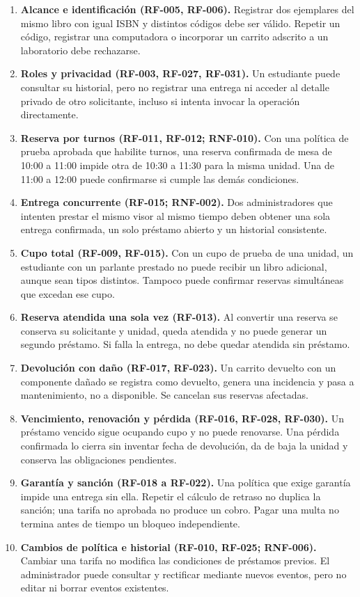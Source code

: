 \begin{enumerate}
    \item \textbf{Alcance e identificaci\'on (RF-005, RF-006).} Registrar dos ejemplares del mismo libro con igual ISBN y distintos c\'odigos debe ser v\'alido. Repetir un c\'odigo, registrar una computadora o incorporar un carrito adscrito a un laboratorio debe rechazarse.
    \item \textbf{Roles y privacidad (RF-003, RF-027, RF-031).} Un estudiante puede consultar su historial, pero no registrar una entrega ni acceder al detalle privado de otro solicitante, incluso si intenta invocar la operaci\'on directamente.
    \item \textbf{Reserva por turnos (RF-011, RF-012; RNF-010).} Con una pol\'itica de prueba aprobada que habilite turnos, una reserva confirmada de mesa de 10:00 a 11:00 impide otra de 10:30 a 11:30 para la misma unidad. Una de 11:00 a 12:00 puede confirmarse si cumple las dem\'as condiciones.
    \item \textbf{Entrega concurrente (RF-015; RNF-002).} Dos administradores que intenten prestar el mismo visor al mismo tiempo deben obtener una sola entrega confirmada, un solo pr\'estamo abierto y un historial consistente.
    \item \textbf{Cupo total (RF-009, RF-015).} Con un cupo de prueba de una unidad, un estudiante con un parlante prestado no puede recibir un libro adicional, aunque sean tipos distintos. Tampoco puede confirmar reservas simult\'aneas que excedan ese cupo.
    \item \textbf{Reserva atendida una sola vez (RF-013).} Al convertir una reserva se conserva su solicitante y unidad, queda atendida y no puede generar un segundo pr\'estamo. Si falla la entrega, no debe quedar atendida sin pr\'estamo.
    \item \textbf{Devoluci\'on con da\~no (RF-017, RF-023).} Un carrito devuelto con un componente da\~nado se registra como devuelto, genera una incidencia y pasa a mantenimiento, no a disponible. Se cancelan sus reservas afectadas.
    \item \textbf{Vencimiento, renovaci\'on y p\'erdida (RF-016, RF-028, RF-030).} Un pr\'estamo vencido sigue ocupando cupo y no puede renovarse. Una p\'erdida confirmada lo cierra sin inventar fecha de devoluci\'on, da de baja la unidad y conserva las obligaciones pendientes.
    \item \textbf{Garant\'ia y sanci\'on (RF-018 a RF-022).} Una pol\'itica que exige garant\'ia impide una entrega sin ella. Repetir el c\'alculo de retraso no duplica la sanci\'on; una tarifa no aprobada no produce un cobro. Pagar una multa no termina antes de tiempo un bloqueo independiente.
    \item \textbf{Cambios de pol\'itica e historial (RF-010, RF-025; RNF-006).} Cambiar una tarifa no modifica las condiciones de pr\'estamos previos. El administrador puede consultar y rectificar mediante nuevos eventos, pero no editar ni borrar eventos existentes.
\end{enumerate}
